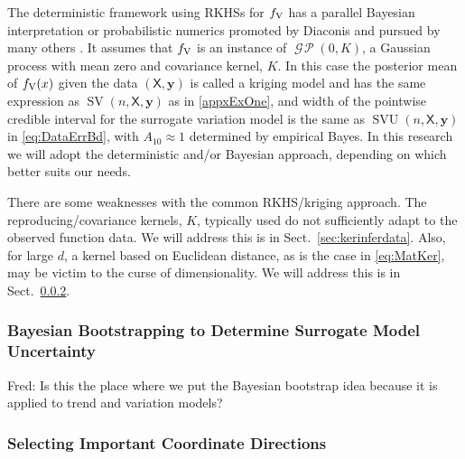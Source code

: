 \documentclass[11pt]{NSFamsart}
\DeclareMathOperator{\GP}{\mathcal{G} \! \mathcal{P}}
\DeclareMathOperator{\SVAR}{SV} %
\DeclareMathOperator{\SVARERR}{SVU} %
\newcommand{\VAR}{\textup{V}}
\newcommand{\mX}{\mathsf{X}}
\newcommand{\by}{{\boldsymbol{y}}}
\newcommand{\FJHNote}[1]{{\color{blue}Fred: #1}}
\begin{document}
The deterministic framework using RKHSs for $f_{\VAR}$ has a parallel Bayesian interpretation or probabilistic numerics promoted by Diaconis \cite{Dia88a} and pursued by many others \cite{BriEtal18a, OHa91a, OwhEtal19a, RasWil06a, Rit00a}.  It assumes that $f_{\VAR}$ is an instance of $\GP(0,K)$, a Gaussian process with mean zero and covariance kernel, $K$.  In this case the posterior mean of $f_{\VAR}(x)$ given the data $(\mX,\by)$ is called a kriging model and has the same expression as $\SVAR(n,\mX,\by)$ as in \eqref{appxExOne}, and width of the pointwise credible interval for the surrogate variation model is the same as $\SVARERR(n,\mX,\by)$ in \eqref{eq:DataErrBd}, with $A_{10} \approx 1$ determined by empirical Bayes.  In this research we will adopt the deterministic and/or Bayesian approach, depending on which better suits our needs.

There are some weaknesses with the common RKHS/kriging approach.  The reproducing/covariance kernels, $K$, typically used do not sufficiently adapt to the observed function data.  We will address this is in Sect.\ \ref{sec:kerinferdata}.  Also, for large $d$, a kernel based on Euclidean distance, as is the case in \eqref{eq:MatKer}, may be victim to the curse of dimensionality.  We will address this is in Sect.\ \ref{sec:selectCoord}.


\subsubsection{Bayesian Bootstrapping to Determine Surrogate Model Uncertainty} \label{sec:BayesianMaybe}
\FJHNote{Is this the place where we put the Bayesian bootstrap idea because it is applied to trend and variation models?}








\subsubsection{Selecting Important Coordinate Directions} \label{sec:selectCoord}
\end{document}
